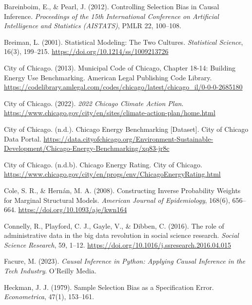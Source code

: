 \begin{description}\setlength{\itemsep}{0pt}
\item[] \hypertarget{bareinboimpearl2012}{}Bareinboim, E., \& Pearl, J. (2012). Controlling Selection Bias in Causal Inference. \textit{Proceedings of the 15th International Conference on Artificial Intelligence and Statistics (AISTATS)}, PMLR 22, 100--108.
\item[] \hypertarget{breiman2001}{}Breiman, L. (2001). Statistical Modeling: The Two Cultures. \textit{Statistical Science}, 16(3), 199--215. \url{https://doi.org/10.1214/ss/1009213726}
\item[] \hypertarget{city2013}{}City of Chicago. (2013). Municipal Code of Chicago, Chapter 18-14: Building Energy Use Benchmarking. American Legal Publishing Code Library. \url{https://codelibrary.amlegal.com/codes/chicago/latest/chicago_il/0-0-0-2685180}
\item[] \hypertarget{city2022}{}City of Chicago. (2022). \textit{2022 Chicago Climate Action Plan}. \url{https://www.chicago.gov/city/en/sites/climate-action-plan/home.html}
\item[] \hypertarget{citynd}{}City of Chicago. (n.d.). Chicago Energy Benchmarking [Dataset]. City of Chicago Data Portal. \url{https://data.cityofchicago.org/Environment-Sustainable-Development/Chicago-Energy-Benchmarking/xq83-jr8c}
\item[] \hypertarget{cityndb}{}City of Chicago. (n.d.b). Chicago Energy Rating. City of Chicago. \url{https://www.chicago.gov/city/en/progs/env/ChicagoEnergyRating.html}
\item[] \hypertarget{colehernan2008}{}Cole, S. R., \& Hernán, M. A. (2008). Constructing Inverse Probability Weights for Marginal Structural Models. \textit{American Journal of Epidemiology}, 168(6), 656--664. \url{https://doi.org/10.1093/aje/kwn164}
\item[] \hypertarget{connellyetal2016}{}Connelly, R., Playford, C. J., Gayle, V., \& Dibben, C. (2016). The role of administrative data in the big data revolution in social science research. \textit{Social Science Research}, 59, 1--12. \url{https://doi.org/10.1016/j.ssresearch.2016.04.015}
\item[] \hypertarget{facure2023}{}Facure, M. (2023). \textit{Causal Inference in Python: Applying Causal Inference in the Tech Industry}. O'Reilly Media.
\item[] \hypertarget{heckman1979}{}Heckman, J. J. (1979). Sample Selection Bias as a Specification Error. \textit{Econometrica}, 47(1), 153--161.

\end{description}
